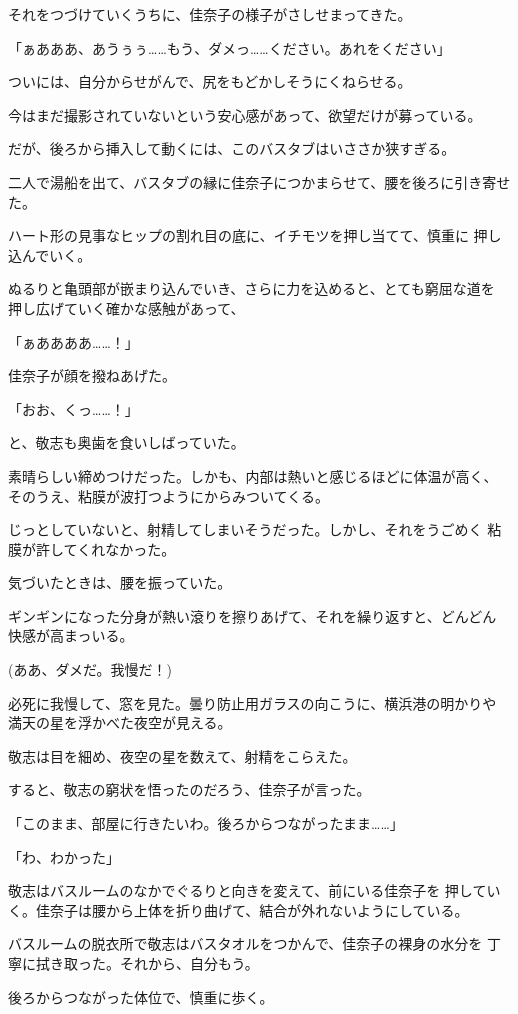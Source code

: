 ﻿\documentclass[
    book,tate,
    line_length=30zw,
    jafontsize=12pt,
    paper=b5j,
    landscape,
    ]{jlreq}
\begin{document}
それをつづけていくうちに、佳奈子の様子がさしせまってきた。

「ぁあああ、あうぅぅ……もう、ダメっ……ください。あれをください」

ついには、自分からせがんで、尻をもどかしそうにくねらせる。

今はまだ撮影されていないという安心感があって、欲望だけが募っている。

だが、後ろから挿入して動くには、このバスタブはいささか狭すぎる。

二人で湯船を出て、バスタブの縁に佳奈子につかまらせて、腰を後ろに引き寄せた。

ハート形の見事なヒップの割れ目の底に、イチモツを押し当てて、慎重に
押し込んでいく。

ぬるりと亀頭部が嵌まり込んでいき、さらに力を込めると、とても窮屈な道を
押し広げていく確かな感触があって、

「ぁああああ……！」

佳奈子が顔を撥ねあげた。

「おお、くっ……！」

と、敬志も奥歯を食いしばっていた。

素晴らしい締めつけだった。しかも、内部は熱いと感じるほどに体温が高く、
そのうえ、粘膜が波打つようにからみついてくる。

じっとしていないと、射精してしまいそうだった。しかし、それをうごめく
粘膜が許してくれなかった。

気づいたときは、腰を振っていた。

ギンギンになった分身が熱い滾りを擦りあげて、それを繰り返すと、どんどん
快感が高まっいる。

(ああ、ダメだ。我慢だ！)

必死に我慢して、窓を見た。曇り防止用ガラスの向こうに、横浜港の明かりや
満天の星を浮かべた夜空が見える。

敬志は目を細め、夜空の星を数えて、射精をこらえた。

すると、敬志の窮状を悟ったのだろう、佳奈子が言った。

「このまま、部屋に行きたいわ。後ろからつながったまま……」

「わ、わかった」

敬志はバスルームのなかでぐるりと向きを変えて、前にいる佳奈子を
押していく。佳奈子は腰から上体を折り曲げて、結合が外れないようにしている。

バスルームの脱衣所で敬志はバスタオルをつかんで、佳奈子の裸身の水分を
丁寧に拭き取った。それから、自分もう。

後ろからつながった体位で、慎重に歩く。
\end{document}
